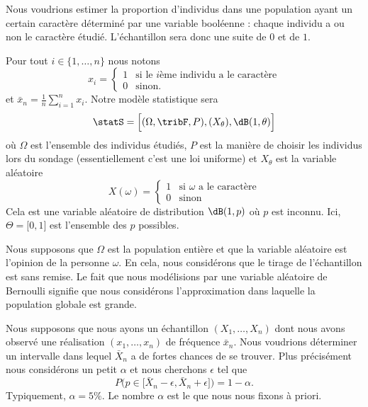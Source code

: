 Nous voudrions estimer la proportion d'individus dans une population ayant un certain caractère déterminé par une variable booléenne : chaque individu a ou non le caractère étudié. L'échantillon sera donc une suite de \( 0\) et de \( 1\).

Pour tout \( i\in\{ 1,\ldots, n \}\) nous notons
\begin{equation}
	x_i=\begin{cases}
		1 & \text{si le } i\text{ème individu a le caractère} \\
		0 & \text{sinon}.
	\end{cases}
\end{equation}
et \( \bar x_n=\frac{1}{ n }\sum_{i=1}^n x_i\). Notre modèle statistique sera
\begin{equation}
	\statS=\Big[ (\Omega,\tribF,P),(X_{\theta}),\dB(1,\theta) \Big]
\end{equation}
où \( \Omega\) est l'ensemble des individus étudiés, \( P\) est la manière de choisir les individus lors du sondage (essentiellement c'est une loi uniforme) et \( X_{\theta}\) est la variable aléatoire
\begin{equation}
	X(\omega)=\begin{cases}
		1 & \text{si } \omega\text{ a le caractère} \\
		0 & \text{sinon}
	\end{cases}
\end{equation}
Cela est une variable aléatoire de distribution \( \dB(1,p)\) où \( p\) est inconnu. Ici, \( \Theta=\mathopen[ 0 , 1 \mathclose]\) est l'ensemble des \( p\) possibles.

\begin{remark}
	Nous supposons que \( \Omega\) est la population entière et que la variable aléatoire est l'opinion de la personne \( \omega\). En cela, nous considérons que le tirage de l'échantillon est sans remise. Le fait que nous modélisions par une variable aléatoire de Bernoulli signifie que nous considérons l'approximation dans laquelle la population globale est grande.
\end{remark}

Nous supposons que nous ayons un échantillon \( (X_1,\ldots,X_n)\) dont nous avons observé une réalisation \( (x_1,\ldots,x_n)\) de fréquence \( \bar x_n\). Nous voudrions déterminer un intervalle dans lequel \( \bar X_n\) a de fortes chances de se trouver. Plus précisément nous considérons un petit \( \alpha\) et nous cherchons \( \epsilon\) tel que
\begin{equation}
	P\big( p\in\mathopen[ \bar X_n-\epsilon , \bar X_n+\epsilon \mathclose] \big)=1-\alpha.
\end{equation}
Typiquement, \( \alpha=5\%\). Le nombre \( \alpha\) est le  que nous nous fixons à priori.

